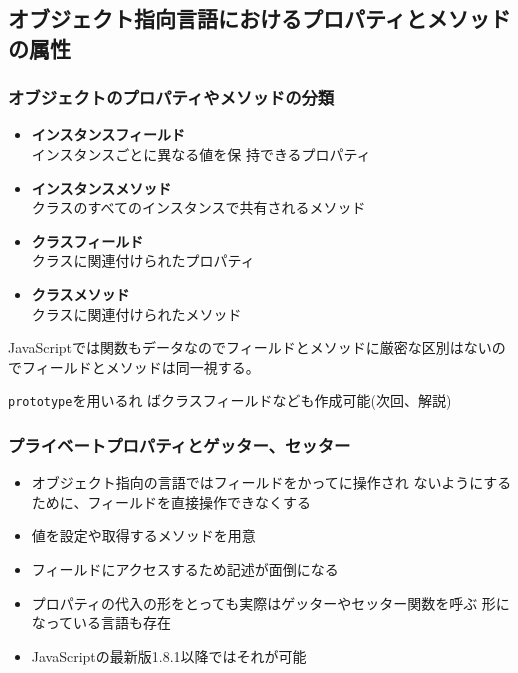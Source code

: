 \subsection{オブジェクト指向言語におけるプロパティとメソッドの属性}
\begin{frame}[containsverbatim]
 \frametitle{オブジェクトのプロパティやメソッドの分類}
\begin{itemize}
 \item {\bfseries インスタンスフィールド}\\インスタンスごとに異なる値を保
       持できるプロパティ
 \item {\bfseries インスタンスメソッド}\\
クラスのすべてのインスタンスで共有されるメソッド
 \item {\bfseries クラスフィールド}\\クラスに関連付けられたプロパティ
 \item {\bfseries クラスメソッド}\\
クラスに関連付けられたメソッド
\end{itemize}
JavaScriptでは関数もデータなのでフィールドとメソッドに厳密な区別はないの
でフィールドとメソッドは同一視する。

\texttt{prototype}を用いるれ
ばクラスフィールドなども作成可能(次回、解説)
\end{frame}
\begin{frame}[containsverbatim]
 \frametitle{プライベートプロパティとゲッター、セッター}
\begin{itemize}
 \item オブジェクト指向の言語ではフィールドをかってに操作され
ないようにするために、フィールドを直接操作できなくする
 \item 値を設定や取得するメソッドを用意
 \item フィールドにアクセスするため記述が面倒になる
 \item プロパティの代入の形をとっても実際はゲッターやセッター関数を呼ぶ
       形になっている言語も存在
 \item JavaScriptの最新版1.8.1以降ではそれが可能
\end{itemize}
\end{frame}
